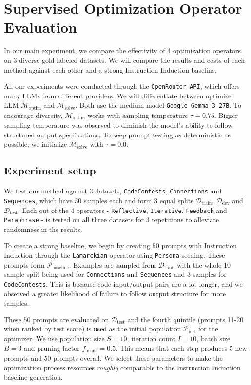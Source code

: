 \section{Supervised Optimization Operator Evaluation}
In our main experiment, we compare the effectivity of 4 optimization operators on 3 diverse gold-labeled datasets.
We will compare the results and costs of each method against each other and a strong Instruction Induction baseline.

All our experiments were conducted through the \texttt{OpenRouter API}, which offers many LLMs from different providers.
We will differentiate between optimizer LLM $\mathcal{M}_{\text{optim}}$ and $\mathcal{M}_{\text{solve}}$.
Both use the medium model \texttt{Google Gemma 3 27B}\cite{gemmateam2025gemma3technicalreport}. 
To encourage diversity, $\mathcal{M}_{\text{optim}}$ works with sampling temperature $\tau = 0.75$. 
Bigger sampling temperature was observed to diminish the model's ability to follow structured output specifications.
To keep prompt testing as deterministic as possible, we initialize $\mathcal{M}_{\text{solve}}$ with $\tau = 0.0$.


\subsection{Experiment setup}
We test our method against 3 datasets, \texttt{CodeContests}, \texttt{Connections}  and \texttt{Sequences}, which have 30 samples each 
and form 3 equal splits $\mathcal{D}_{\text{train}}$, $\mathcal{D}_{\text{dev}}$ and $\mathcal{D}_{\text{test}}$. Each out of the 4 operators - \texttt{Reflective}, \texttt{Iterative}, \texttt{Feedback} and \texttt{Paraphrase} - is tested on all three datasets for 3 repetitions
to alleviate randomness in the results.

To create a strong baseline, we begin by creating $50$ prompts with Instruction Induction through the \texttt{Lamarckian} operator 
using \texttt{Persona}\cite{ge2024scalingsyntheticdatacreation} seeding. These prompts form $\mathcal{P}_{\text{baseline}}$. Examples are sampled from $\mathcal{D}_{\text{train}}$ with the whole 10 sample split being used for \texttt{Connections} and \texttt{Sequences}
and 3 samples for \texttt{CodeContests}. This is because code input/output pairs are a lot longer, and we observed a greater likelihood of failure to follow output structure for more samples.

These $50$ prompts are evaluated on $\mathcal{D}_{\text{test}}$ and the fourth quintile (prompts 11-20 when ranked by test score) is used as the initial population $\mathcal{P}_{\text{init}}$ for the optimizer.
We use population size $S=10$, iteration count $I=10$, batch size $B=3$ and pruning factor $f_{\text{prune}} = 0.5$. This means that each step produces $5$ new prompts and $50$ prompts overall.
We select these parameters to make the optimization process resources \textit{roughly} comparable to the Instruction Induction baseline generation.


